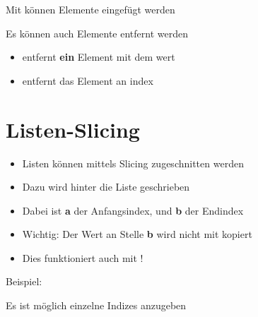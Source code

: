 \begin{frame}
    \slidehead
    Mit  können Elemente eingefügt werden
    \pause
\end{frame}

\begin{frame}
    \slidehead
    Es können auch Elemente entfernt werden
    \begin{itemize}[<+->]
       \item {} entfernt \textbf{ein} Element mit dem wert 
        \item {} entfernt das Element an index 
    \end{itemize}
\end{frame}

\livecoding

\section{Listen-Slicing}
\begin{frame}
    \slidehead
    \begin{itemize}
        \item Listen können mittels Slicing zugeschnitten werden
            \pause
        \item Dazu wird  hinter die Liste geschrieben
        \item Dabei ist \textbf{a} der Anfangsindex, und \textbf{b} der Endindex
            \pause
        \item Wichtig: Der Wert an Stelle \textbf{b} wird nicht mit kopiert
        \item Dies funktioniert auch mit !
    \end{itemize}
    \pause

    \begin{block}{Beispiel:}
    \end{block}
\end{frame}

\begin{frame}
    \slidehead
    Es ist möglich einzelne Indizes anzugeben
\end{frame}

